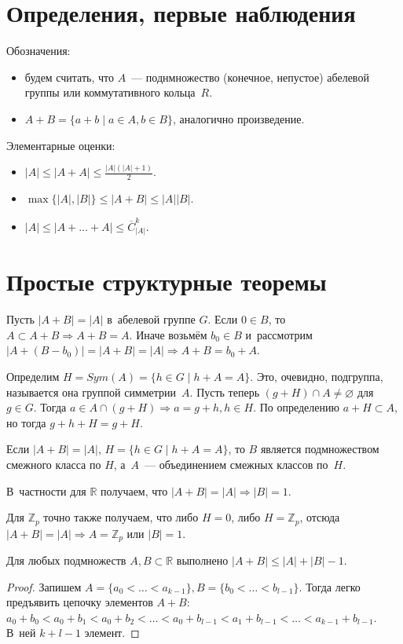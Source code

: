\documentclass{article}
\begin{document}
\section{Определения, первые наблюдения}

Обозначения:
\begin{itemize}
	\item будем считать, что $A$~--- поднмножество (конечное, непустое) абелевой
		группы или коммутативного кольца~$R$.
	\item $A + B = \{a + b \mid a \in A, b \in B\}$, аналогично произведение.
\end{itemize}

Элементарные оценки:
\begin{itemize}
	\item $|A| \le |A + A| \le \frac{|A|(|A|+1)}{2}$.
	\item $\max\{|A|,|B|\} \le |A + B| \le |A||B|$.
	\item $|A| \le |A + \ldots + A| \le \overline{C}_{|A|}^k$.
\end{itemize}

\section{Простые структурные теоремы}

Пусть $|A + B| = |A|$ в~абелевой группе $G$. Если $0 \in B$, то $A \subset A + B
\Rightarrow A + B = A$. Иначе возьмём $b_0 \in B$ и~рассмотрим $|A + (B - b_0)|
= |A + B| = |A| \Rightarrow A + B = b_0 + A$.

Определим $H = Sym(A) = \{h \in G \mid h + A = A\}$. Это, очевидно, подгруппа,
называется она группой симметрии~$A$. Пусть теперь $(g + H) \cap A \ne
\varnothing$ для $g \in G$. Тогда $a \in A \cap (g + H) \Rightarrow a = g + h,
h \in H$. По определению $a + H \subset A$, но тогда $g + h + H = g + H$.

\begin{theorem}
	Если $|A + B| = |A|$,  $H = \{h \in G \mid h + A = A\}$, то $B$ является
	подмножеством смежного класса по $H$, а~$A$~--- объединением смежных классов
	по~$H$.
\end{theorem}

В~частности для $\mathbb{R}$ получаем, что $|A + B| = |A| \Rightarrow |B| = 1$.

Для $\mathbb{Z}_p$ точно также получаем, что либо $H = 0$, либо $H =
\mathbb{Z}_p$, отсюда $|A + B| = |A| \Rightarrow A = \mathbb{Z}_p$ или $|B| =
1$.

\begin{claim}
	Для любых подмножеств $A, B \subset \mathbb{R}$ выполнено $|A + B| \le |A| +
	|B| - 1$.
\end{claim}
\begin{proof}
	Запишем $A = \{a_0 < \ldots < a_{k-1}\}, B = \{b_0 < \ldots < b_{l-1}\}$.
	Тогда легко предъявить цепочку элементов $A + B$: $a_0 + b_0 < a_0 + b_1 <
	a_0 + b_2 < \ldots < a_0 + b_{l-1} < a_1 + b_{l-1} < \ldots < a_{k-1} +
	b_{l-1}$. В~ней $k + l - 1$ элемент.
\end{proof}
\end{document}
